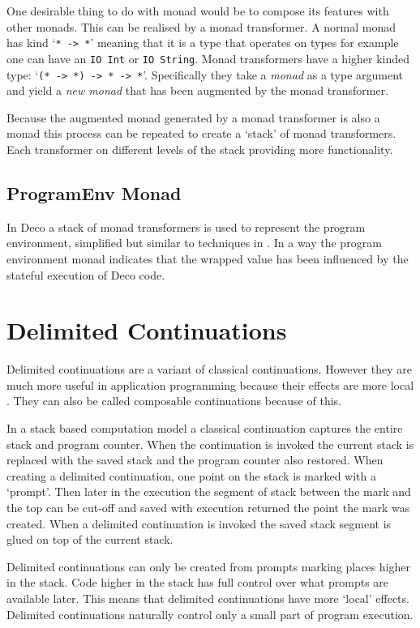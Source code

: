 \documentclass[]{article}
\newcommand{\type}[1]{\texttt{#1}}
\begin{document}
One desirable thing to do with monad would be to compose its features with
other monads. This can be realised by a monad transformer. A normal monad has
kind `\type{* -> *}' meaning that it is a type that operates on types for
example one can have an \type{IO Int} or \type{IO String}. Monad transformers
have a higher kinded type: `\type{(* -> *) -> * -> *}'. Specifically they take
a \emph{monad} as a type argument and yield a \emph{new monad} that has
been augmented by the monad transformer.

Because the augmented monad generated by a monad transformer is also a monad
this process can be repeated to create a `stack' of monad transformers. Each
transformer on different levels of the stack providing more functionality.

\subsection{ProgramEnv Monad}

In Deco a stack of monad transformers is used to represent the program
environment, simplified but similar to techniques in \cite{Liang:Unknown1}. In
a way the program environment monad indicates that the wrapped value has been
influenced by the stateful execution of Deco code.

\section{Delimited Continuations}
\label{discussion:delcont}

Delimited continuations are a variant of classical continuations. However they
are much more useful in application programming because their effects are more
local \cite{Oleg:2011}. They can also be called composable continuations
because of this.

In a stack based computation model a classical continuation captures the
entire stack and program counter. When the continuation is invoked the current
stack is replaced with the saved stack and the program counter also restored.
When creating a delimited continuation, one point on the stack is marked with
a `prompt'. Then later in the execution the segment of stack between the mark
and the top can be cut-off and saved with execution returned the point the
mark was created. When a delimited continuation is invoked the saved
stack segment is glued on top of the current stack.

Delimited continuations can only be created from prompts marking places higher
in the stack. Code higher in the stack has full control over what prompts are
available later. This means that delimited continuations have more `local'
effects. Delimited continuations naturally control only a small part of
program execution.
\end{document}
